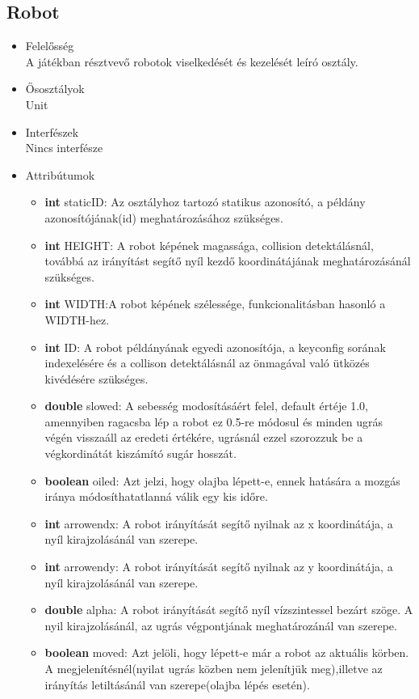 \subsection{Robot}
\begin{itemize}
\item Felelősség\\
A játékban résztvevő robotok viselkedését és kezelését leíró osztály.
\item Ősosztályok\\
Unit
\item Interfészek\\
Nincs interfésze
\item Attribútumok
	\begin{itemize}
		\item \textbf{int} staticID: Az osztályhoz tartozó statikus azonosító, a példány                azonosítójának(id) meghatározásához szükséges.
		\item \textbf{int} HEIGHT: A robot képének magassága, collision                      detektálásnál, továbbá az irányítást segítő nyíl kezdő koordinátájának                  meghatározásánál szükséges.
		\item \textbf{int} WIDTH:A robot képének szélessége, funkcionalitásban hasonló a WIDTH-hez.
		\item \textbf{int} ID: A robot példányának egyedi azonosítója, a keyconfig sorának                     indexelésére és a collison detektálásnál az önmagával való ütközés                      kivédésére szükséges.
		\item \textbf{double} slowed: A sebesség modosításáért felel, default értéje 1.0, amennyiben ragacsba lép a robot ez 0.5-re módosul és minden ugrás végén visszaáll az eredeti értékére, ugrásnál ezzel szorozzuk be a végkordinátát kiszámító sugár hosszát.
		\item \textbf{boolean} oiled: Azt jelzi, hogy olajba lépett-e, ennek hatására a mozgás iránya módosíthatatlanná válik egy kis időre. 
		\item \textbf{int} arrowendx: A robot irányítását segítő nyilnak az x koordinátája, a nyíl kirajzolásánál van szerepe.
		\item \textbf{int} arrowendy: A robot irányítását segítő nyilnak az y koordinátája, a nyíl kirajzolásánál van szerepe.
		\item \textbf{double} alpha: A robot irányítását segítő nyíl vízszintessel bezárt szöge. A nyil kirajzolásánál, az ugrás végpontjának meghatározánál van szerepe.
		\item \textbf{boolean} moved: Azt jelöli, hogy lépett-e már a robot az aktuális körben. A megjelenítésnél(nyilat ugrás közben nem jelenítjük meg),illetve az irányítás letiltásánál van szerepe(olajba lépés esetén).

\end{itemize}
\end{itemize}
